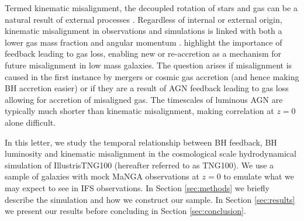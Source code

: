 \documentclass[fleqn,usenatbib]{mnras}
\newcommand{\red}[1]{{\textcolor{red}{#1}}}
\begin{document}
Termed kinematic misalignment, the decoupled rotation of stars and gas can be a natural result of external processes \cite[e.g.][]{davis2011, barrera2015, vdvoort2015, jin2016, bryant2019, duckworth2019_halo, li_decoupling2019}. Regardless of internal or external origin, kinematic misalignment in observations and simulations is linked with both a lower gas mass fraction and angular momentum \citep[][]{starkenburg+19, duckworth2020, khim2019}. \citet{starkenburg+19} highlight the importance of feedback leading to gas loss, enabling new or re-accretion as a mechanism for future misalignment in low mass galaxies. The question arises if misalignment is caused in the first instance by mergers or cosmic gas accretion (and hence making BH accretion easier) or if they are a result of AGN feedback leading to gas loss allowing for accretion of misaligned gas.
The timescales of luminous AGN are typically much shorter than kinematic misalignment, making correlation at $z=0$ alone difficult. 

In this letter, we study the temporal relationship between BH feedback, BH luminosity and kinematic misalignment in the cosmological scale hydrodynamical simulation of IllustrisTNG100 (hereafter referred to as TNG100). We use a sample of galaxies with mock MaNGA \citep[Mapping Galaxies at Apache Point;][]{bundy2015, blanton2017} observations at $z=0$ to emulate what we may expect to see in IFS observations. In Section \ref{sec:methods} we briefly describe the simulation and how we construct our sample. In Section \ref{sec:results} we present our results before concluding in Section \ref{sec:conclusion}. 
\end{document}
